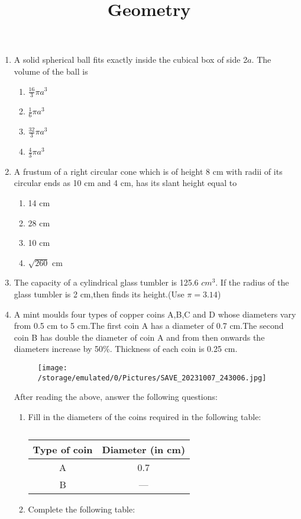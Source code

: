\documentclass[12pt]{article}
\title{Geometry}
\begin{document}
\maketitle
\captionsetup[figure]{labelsep=space}
\begin{enumerate}

 \item A solid spherical ball fits exactly inside the cubical box of side 2$a$. The volume of the ball is
     \begin{enumerate}
         \item $\frac{16}{3}{\pi a^3}$
         \item $\frac{1}{6}{\pi a^3}$
         \item $\frac{32}{3}{\pi a^3}$
         \item $\frac{4}{3}{\pi a^3}$
     \end{enumerate}
  \item A frustum of a right circular cone which is of height 8 cm with radii of its circular ends as 10 cm and 4 cm, has its slant height equal to
       \begin{enumerate}
           \item 14 cm
           \item 28 cm
           \item 10 cm
           \item $\sqrt{260}$ cm
        \end{enumerate}
 \item The capacity of a cylindrical glass tumbler is 125.6 $cm^3$. If the radius of the glass tumbler is 2 cm,then finds its height.(Use $\pi=3.14$)
 
 \item A mint moulds four types of copper coins A,B,C and D whose diameters vary from 0.5 cm to 5 cm.The first coin A has a diameter of 0.7 cm.The second coin B has double the diameter of coin A and from then onwards the diameters increase by 50\%. Thickness of each coin is 0.25 cm.
     \begin{figure}[H]
         \centering
         \texttt{[image: /storage/emulated/0/Pictures/SAVE\_20231007\_243006.jpg]}
         \caption{}
         \label{SAVE_20231007_243006}
     \end{figure}
         After reading the above, answer the following questions:
    \begin{enumerate}
     \item  Fill in the diameters of the coins required in the following table:
    \begin{table}[H]
    \centering
    \caption{}
    \label{tab:a}
    \begin{tabular}{|c|c|}
        \hline
        Type of coin & Diameter (in cm) \\
        \hline
         A & 0.7 \\ \hline
         B & --- \\
        \hline
    \end{tabular}
\end{table}
 \item  Complete the following table:


\end{enumerate}
\end{enumerate}
\end{document}
